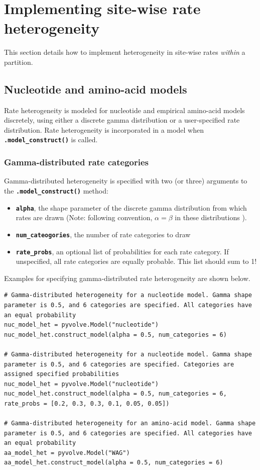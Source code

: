 \documentclass{article}
\newcommand{\code}[1]{\textbf{\texttt{\small{#1}}}}
\begin{document}
\section{Implementing site-wise rate heterogeneity}\label{sec:sitehet}

This section details how to implement heterogeneity in site-wise rates \emph{within} a partition.


\subsection{Nucleotide and amino-acid models}

Rate heterogeneity is modeled for nucleotide and empirical amino-acid models discretely, using either a discrete gamma distribution or a user-specified rate distribution. Rate heterogeneity is incorporated in a model when \code{.model\_construct()} is called. 

\subsubsection{Gamma-distributed rate categories}

Gamma-distributed heterogeneity is specified with two (or three) arguments to the \code{.model\_construct()} method:
\begin{itemize}
	\item \code{alpha}, the shape parameter of the discrete gamma distribution from which rates are drawn (Note: following convention, $\alpha = \beta$ in these distributions \citep{Yang2006}).
	\item \code{num\_cateogories}, the number of rate categories to draw
	\item \code{rate\_probs}, an optional list of probabilities for each rate category. If unspecified, all rate categories are equally probable. This list should sum to 1!
\end{itemize}

Examples for specifying gamma-distributed rate heterogeneity are shown below.

\begin{lstlisting}
# Gamma-distributed heterogeneity for a nucleotide model. Gamma shape parameter is 0.5, and 6 categories are specified. All categories have an equal probability
nuc_model_het = pyvolve.Model("nucleotide")
nuc_model_het.construct_model(alpha = 0.5, num_categories = 6)

# Gamma-distributed heterogeneity for a nucleotide model. Gamma shape parameter is 0.5, and 6 categories are specified. Categories are assigned specified probabilities
nuc_model_het = pyvolve.Model("nucleotide")
nuc_model_het.construct_model(alpha = 0.5, num_categories = 6, rate_probs = [0.2, 0.3, 0.3, 0.1, 0.05, 0.05])

# Gamma-distributed heterogeneity for an amino-acid model. Gamma shape parameter is 0.5, and 6 categories are specified. All categories have an equal probability
aa_model_het = pyvolve.Model("WAG")
aa_model_het.construct_model(alpha = 0.5, num_categories = 6)
\end{lstlisting}
\end{document}
